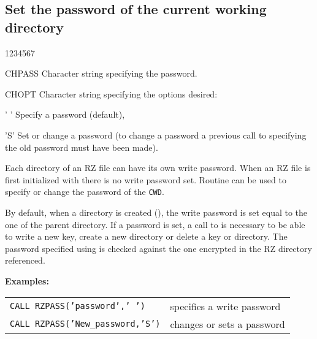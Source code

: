 \subsection{Set the password of the current working directory}

\begin{DLtt}{1234567}
\item[CHPASS]Character string specifying the password.
\item[CHOPT]Character string specifying the options desired:
\begin{DLtt}{12}
\item[' ']Specify a password (default),
\item['S']Set or change a password (to change a password a previous call to
 specifying the old password must have been made).
\end{DLtt}
\end{DLtt}

Each directory of an RZ file can have its own write password.
When an RZ file is first initialized with  there is
no write password set.
Routine  can be used to specify
or change the password of the {\tt CWD}.
\par By default, when a directory is created (), the write
password is set equal to the one of the parent directory.
If a password is set, a call to  is necessary to be able
to write a new key, create a new directory or delete a key or directory.
The password specified using  is
checked against the one encrypted in the RZ directory referenced.

{\bf Examples:}\quad
\begin{tabular}[t]{>{\tt}l@{\qquad}l}
CALL RZPASS('password',' ')   & specifies a write password \\[2mm]
CALL RZPASS('New\_password,'S')& changes or sets a password
\end{tabular}


